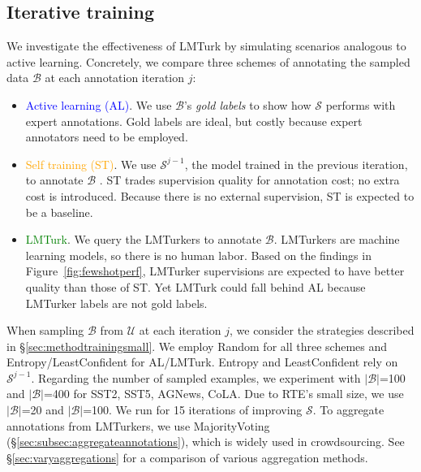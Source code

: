 \documentclass[11pt]{article}
\def\md{LMTurk\xspace}
\def\mdr{LMTurker\xspace}
\def\mdrs{LMTurkers\xspace}
\def\figref#1{Figure~\ref{fig:#1}}
\def\secref#1{\S\ref{sec:#1}}
\begin{document}
\subsection{Iterative training}
We investigate
the effectiveness
of \md
by simulating
scenarios
analogous to
active learning.
Concretely,
we compare three
schemes of annotating
the sampled data
$\mathcal{B}$
at each annotation iteration $j$:

\begin{itemize}
\item \textcolor{blue}{Active learning (AL)}. We use $\mathcal{B}$'s
  \emph{gold labels} to show how $\mathcal{S}$ performs with expert
  annotations.  Gold labels are ideal, but costly because expert
  annotators need to be employed.

\item   \textcolor{orange}{Self training (ST)}.
  We use $\mathcal{S}^{j-1}$,
  the  model trained in
  the previous iteration,
  to annotate
  $\mathcal{B}$ \citep{yarowsky-1995-unsupervised,abney-2004-understanding,lee2013pseudo}.
  ST trades supervision
  quality for
  annotation cost;
  no extra cost is introduced.
  Because there is
  no external
  supervision,
  ST is expected to be a baseline.

\item   \textcolor{green}{\md}.
  We query the \mdrs
  to annotate $\mathcal{B}$.
  \mdrs
  are machine learning models, so there is no human labor.
  Based on
  the findings in \figref{fewshotperf}, \mdr supervisions
  are expected to have better quality
  than those of ST.
  Yet \md could fall behind
  AL because \mdr labels are not gold labels.
\end{itemize}


When sampling
$\mathcal{B}$ from $\mathcal{U}$ at
each iteration $j$,
we consider the strategies
described in
\secref{methodtrainingsmall}.
We employ Random for all three schemes and
Entropy/LeastConfident for
AL/\md.
Entropy and LeastConfident 
rely on $\mathcal{S}^{j-1}$.
Regarding the number of sampled examples,
we experiment with
$|\mathcal{B}|$=100 and $|\mathcal{B}|$=400
for SST2, SST5, AGNews,  CoLA.
Due to RTE's small size, we use
$|\mathcal{B}|$=20 and $|\mathcal{B}|$=100.
We run for 15 iterations of improving $\mathcal{S}$.
To aggregate annotations from \mdrs,
we use MajorityVoting
(\secref{subsec:aggregateannotations}),
which is widely used in crowdsourcing.
See \secref{varyaggregations} for a comparison
of various  aggregation methods.
\end{document}
